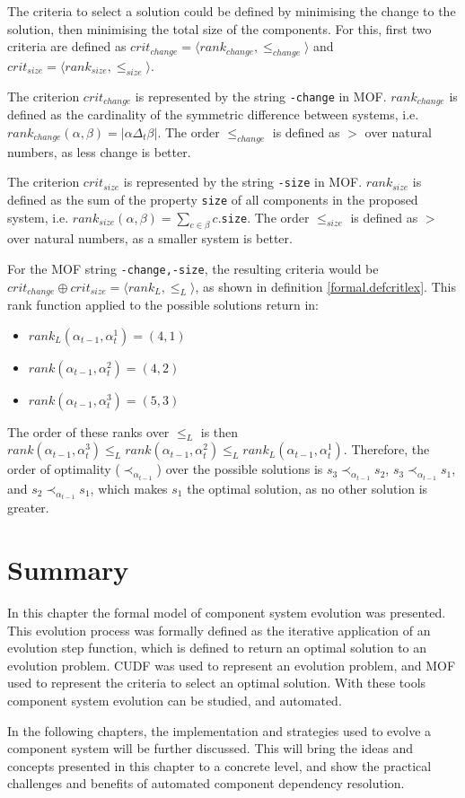 The criteria to select a solution could be defined by minimising the change to the solution, then minimising the total size of the components.
For this, first two criteria are defined as $crit_{change} = \langle rank_{change}, \leq_{change} \rangle$ and $crit_{size} = \langle rank_{size}, \leq_{size} \rangle$.

The criterion $crit_{change}$ is represented by the string \verb+-change+ in MOF.
$rank_{change}$ is defined as the cardinality of the symmetric difference between systems, i.e. $rank_{change}(\alpha,\beta) = |\alpha \Delta_t \beta|$.
The order $\leq_{change}$ is defined as $>$ over natural numbers, as less change is better. 

The criterion $crit_{size}$ is represented by the string \verb+-size+ in MOF.
$rank_{size}$ is defined as the sum of the property \verb+size+ of all components in the  proposed system, i.e. $rank_{size}(\alpha,\beta) = \sum_{c \in \beta} c$.\verb+size+.
The order $\leq_{size}$ is defined as $>$ over natural numbers, as a smaller system is better. 

For the MOF string \verb+-change,-size+, the resulting criteria would be $crit_{change} \oplus crit_{size} = \langle rank_L, \leq_L \rangle$, as shown in definition \ref{formal.defcritlex}.
This rank function applied to the possible solutions return in:
\begin{itemize}
  \item $rank_L(\alpha_{t-1},\alpha_t^1 ) = (4, 1)$
  \item $rank(\alpha_{t-1},\alpha_t^2 ) = (4, 2)$
  \item $rank(\alpha_{t-1},\alpha_t^3 ) = (5, 3)$
\end{itemize}
The order of these ranks over $\leq_L$ is then $rank(\alpha_{t-1},\alpha_t^3) \leq_L rank(\alpha_{t-1},\alpha_t^2) \leq_L rank_L(\alpha_{t-1},\alpha_t^1)$.
Therefore, the order of optimality ($\prec_{\alpha_{t-1}}$) over the possible solutions is $s_3 \prec_{\alpha_{t-1}} s_2$, $s_3 \prec_{\alpha_{t-1}} s_1$, and $s_2 \prec_{\alpha_{t-1}} s_1$,
which makes $s_1$ the optimal solution, as no other solution is greater. 

\section{Summary}
In this chapter the formal model of component system evolution was presented.
This evolution process was formally defined as the iterative application of an evolution step function,
which is defined to return an optimal solution to an evolution problem.
CUDF was used to represent an evolution problem, and MOF used to represent the criteria to select an optimal solution.
With these tools component system evolution can be studied, and automated.

In the following chapters, the implementation and strategies used to evolve a component system will be further discussed.
This will bring the ideas and concepts presented in this chapter to a concrete level, and show the practical challenges and benefits of automated component dependency resolution. 